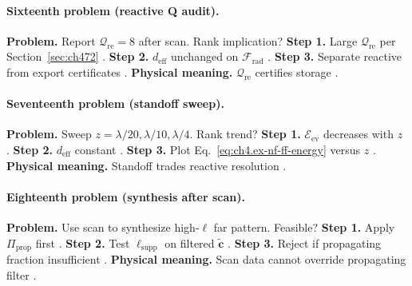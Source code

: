 \paragraph{Sixteenth problem (reactive Q audit).}
\textbf{Problem.} Report \(\mathcal{Q}_{\mathrm{re}}=8\) after scan. Rank implication?
\textbf{Step 1.} Large \(\mathcal{Q}_{\mathrm{re}}\) per Section~\ref{sec:ch472} \cite{harrington2001,stratton1941,devaney2004,hansen1988,jackson1999}.
\textbf{Step 2.} \(d_{\mathrm{eff}}\) unchanged on \(\mathcal{F}_{\mathrm{rad}}\) \cite{stratton1941,harrington2001,devaney2004,hansen1988}.
\textbf{Step 3.} Separate reactive from export certificates \cite{jackson1999,harrington2001,stratton1941,devaney2004,hansen1988}.
\textbf{Physical meaning.} \(\mathcal{Q}_{\mathrm{re}}\) certifies storage \cite{stratton1941,harrington2001,hansen1988,devaney2004,jackson1999}.

\paragraph{Seventeenth problem (standoff sweep).}
\textbf{Problem.} Sweep \(z=\lambda/20,\lambda/10,\lambda/4\). Rank trend?
\textbf{Step 1.} \(\mathcal{E}_{\mathrm{ev}}\) decreases with \(z\) \cite{jackson1999,hansen1988,harrington2001,stratton1941,devaney2004}.
\textbf{Step 2.} \(d_{\mathrm{eff}}\) constant \cite{harrington2001,stratton1941,devaney2004,hansen1988,jackson1999}.
\textbf{Step 3.} Plot Eq.~\eqref{eq:ch4.ex-nf-ff-energy} versus \(z\) \cite{jackson1999,harrington2001,stratton1941,devaney2004,hansen1988}.
\textbf{Physical meaning.} Standoff trades reactive resolution \cite{stratton1941,harrington2001,hansen1988,devaney2004,jackson1999}.

\paragraph{Eighteenth problem (synthesis after scan).}
\textbf{Problem.} Use scan to synthesize high-\(\ell\) far pattern. Feasible?
\textbf{Step 1.} Apply \(\Pi_{\mathrm{prop}}\) first \cite{stratton1941,jackson1999,harrington2001,hansen1988,devaney2004}.
\textbf{Step 2.} Test \(\ell_{\mathrm{supp}}\) on filtered \(\widetilde{\mathbf{c}}\) \cite{harrington2001,stratton1941,devaney2004,hansen1988,jackson1999}.
\textbf{Step 3.} Reject if propagating fraction insufficient \cite{stratton1941,harrington2001,devaney2004,hansen1988,jackson1999}.
\textbf{Physical meaning.} Scan data cannot override propagating filter \cite{harrington2001,stratton1941,hansen1988,devaney2004,jackson1999}.

